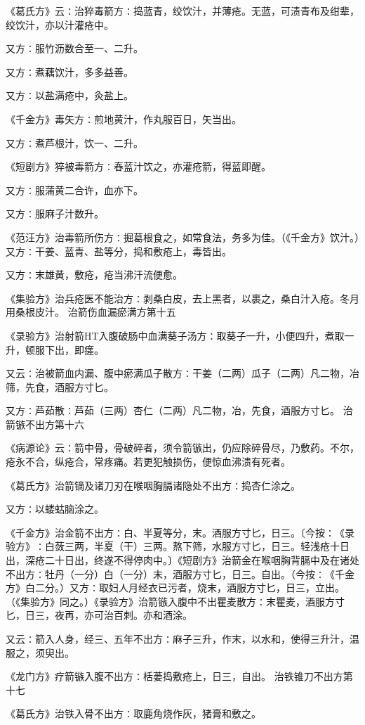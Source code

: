 \documentclass[a4paper,12pt,UTF8,twoside]{ctexbook}
\begin{document}
《葛氏方》云∶治猝毒箭方∶捣蓝青，绞饮汁，并薄疮。无蓝，可渍青布及绀辈，绞饮汁，亦以汁灌疮中。

又方∶服竹沥数合至一、二升。

又方∶煮藕饮汁，多多益善。

又方∶以盐满疮中，灸盐上。

《千金方》毒矢方∶煎地黄汁，作丸服百日，矢当出。

又方∶煮芦根汁，饮一、二升。

《短剧方》猝被毒箭方∶舂蓝汁饮之，亦灌疮箭，得蓝即醒。

又方∶服蒲黄二合许，血亦下。

又方∶服麻子汁数升。

《范汪方》治毒箭所伤方∶掘葛根食之，如常食法，务多为佳。（《千金方》饮汁。）又方∶干姜、蓝青、盐等分，捣和敷疮上，毒皆出。

又方∶末雄黄，敷疮，疮当沸汗流便愈。

《集验方》治兵疮医不能治方∶剥桑白皮，去上黑者，以裹之，桑白汁入疮。冬月用桑根皮汁。
治箭伤血漏瘀满方第十五

《录验方》治射箭HT入腹破肠中血满葵子汤方∶取葵子一升，小便四升，煮取一升，顿服下出，即瘥。

又云∶治被箭血内漏、腹中瘀满瓜子散方∶干姜（二两）瓜子（二两）凡二物，冶筛，先食，酒服方寸匕。

又方∶芦茹散∶芦茹（三两）杏仁（二两）凡二物，冶，先食，酒服方寸匕。
治箭镞不出方第十六

《病源论》云∶箭中骨，骨破碎者，须令箭镞出，仍应除碎骨尽，乃敷药。不尔，疮永不合，纵疮合，常疼痛。若更犯触损伤，便惊血沸溃有死者。

《葛氏方》治箭镝及诸刀刃在喉咽胸膈诸隐处不出方∶捣杏仁涂之。

又方∶以蝼蛄脑涂之。

《千金方》治金箭不出方∶白、半夏等分，末。酒服方寸匕，日三。〔今按∶《录验方》∶白蔹三两，半夏（干）三两。熬下筛，水服方寸匕，日三。轻浅疮十日出，深疮二十日出，终遂不得停肉中。〕《短剧方》治箭金在喉咽胸背膈中及在诸处不出方∶牡丹（一分）白（一分）末，酒服方寸匕，日三。自出。（今按∶《千金方》白二分。）又方∶取妇人月经衣已污者，烧末，酒服方寸匕，日三，立出。（《集验方》同之。）《录验方》治箭镞入腹中不出瞿麦散方∶末瞿麦，酒服方寸匕，日三，夜再，亦可治百刺。亦和酒涂。

又云∶箭入人身，经三、五年不出方∶麻子三升，作末，以水和，使得三升汁，温服之，须臾出。

《龙门方》疗箭镞入腹不出方∶栝蒌捣敷疮上，日三，自出。
治铁锥刀不出方第十七

《葛氏方》治铁入骨不出方∶取鹿角烧作灰，猪膏和敷之。
\end{document}
